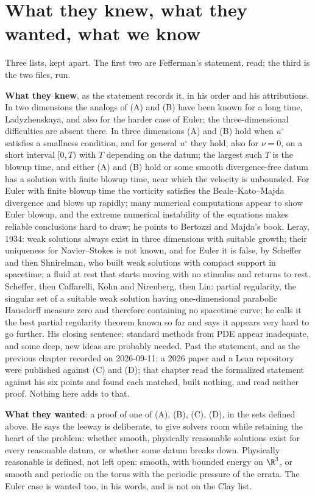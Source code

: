 \section{What they knew, what they wanted, what we know}

Three lists, kept apart. The first two are Fefferman's statement, read; the third is the two files,
run.

\textbf{What they knew}, as the statement records it, in his order and his attributions. In two
dimensions the analogs of (A) and (B) have been known for a long time, Ladyzhenskaya, and also for
the harder case of Euler; the three-dimensional difficulties are absent there. In three dimensions (A)
and (B) hold when $u^\circ$ satisfies a smallness condition, and for general $u^\circ$ they hold,
also for $\nu = 0$, on a short interval $[0,T)$ with $T$ depending on the datum; the largest such $T$
is the blowup time, and either (A) and (B) hold or some smooth divergence-free datum has a solution
with finite blowup time, near which the velocity is unbounded. For Euler with finite blowup time the
vorticity satisfies the Beale--Kato--Majda divergence and blows up rapidly; many numerical
computations appear to show Euler blowup, and the extreme numerical instability of the equations
makes reliable conclusions hard to draw; he points to Bertozzi and Majda's book. Leray, 1934: weak
solutions always exist in three dimensions with suitable growth; their uniqueness for Navier--Stokes
is not known, and for Euler it is false, by Scheffer and then Shnirelman, who built weak solutions
with compact support in spacetime, a fluid at rest that starts moving with no stimulus and returns to
rest. Scheffer, then Caffarelli, Kohn and Nirenberg, then Lin: partial regularity, the singular set of
a suitable weak solution having one-dimensional parabolic Hausdorff measure zero and therefore
containing no spacetime curve; he calls it the best partial regularity theorem known so far and says it appears
very hard to go further. His closing sentence: standard methods from PDE appear inadequate, and some
deep, new ideas are probably needed. Past the statement, and as the previous chapter recorded on
2026-09-11: a 2026 paper and a Lean repository were published against (C) and (D); that chapter read
the formalized statement against his six points and found each matched, built nothing, and read
neither proof. Nothing here adds to that.

\textbf{What they wanted}: a proof of one of (A), (B), (C), (D), in the sets defined above. He says the
leeway is deliberate, to give solvers room while retaining the heart of the problem: whether smooth,
physically reasonable solutions exist for every reasonable datum, or whether some datum breaks down.
Physically reasonable is defined, not left open: smooth, with bounded energy on $\R^3$, or smooth and
periodic on the torus with the periodic pressure of the errata. The Euler case is wanted too, in his
words, and is not on the Clay list.

